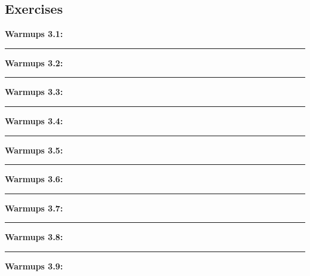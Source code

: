 \documentclass{article}
\begin{document}
\subsection{Exercises}
\textbf{Warmups 3.1:}

\noindent\rule{\textwidth}{0.4pt}
\textbf{Warmups 3.2:}

\noindent\rule{\textwidth}{0.4pt}
\textbf{Warmups 3.3:}

\noindent\rule{\textwidth}{0.4pt}
\textbf{Warmups 3.4:}

\noindent\rule{\textwidth}{0.4pt}
\textbf{Warmups 3.5:}

\noindent\rule{\textwidth}{0.4pt}
\textbf{Warmups 3.6:}

\noindent\rule{\textwidth}{0.4pt}
\textbf{Warmups 3.7:}

\noindent\rule{\textwidth}{0.4pt}
\textbf{Warmups 3.8:}

\noindent\rule{\textwidth}{0.4pt}
\textbf{Warmups 3.9:}
\end{document}
